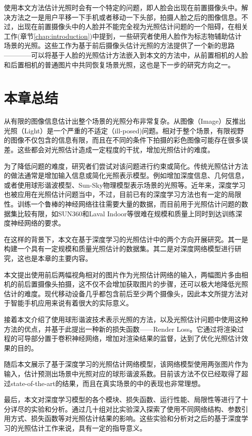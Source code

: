 使用本文方法估计光照时会有一个特定的问题，即人脸会出现在前置摄像头中。解决方法之一是用户平移一下手机或者移动一下头部，拍摄人脸之后的图像信息。不过，出现在前置摄像头中的人脸并不能完全视为光照估计问题的一个阻碍，在相关工作(章节\ref{chap:introduction})中提到，一些研究者使用人脸作为标志物辅助估计场景的光照。这些工作为基于前后摄像头估计光照的方法提供了一个新的思路————可以将基于人脸的光照估计方法嵌入到本文的方法中，从前置相机的人脸和后置相机的普通图片中共同恢复场景光照，这也是下一步的研究方向之一。
\section{本章总结}
从有限的图像信息估计出整个场景的光照分布非常复杂。从图像（Image）反推出光照（Light）是一个严重的不适定（ill-posed)问题。相对于整个场景，有限视野的图像不仅包含的信息有限，而且在不同的条件下拍摄的彩色图像可能存在很多误差。这些都会对光照估计造成一定程度的干扰，增加光照估计的难度。

为了降低问题的难度，研究者们尝试对该问题进行约束或简化。传统光照估计方法的做法通常是增加输入信息或简化光照表示模型。例如增加深度信息、几何信息，或者使用球形谐波模型、Sun-Sky物理模型表示场景的光照等。近年来，深度学习也被应用在光照估计问题当中，不过，目前已有的深度学习方法也有一定的局限性。训练一个鲁棒的神经网络往往需要大量的数据，而目前用于光照估计问题的数据集比较有限，如SUN360\cite{xiao2012recognizing}和Laval Indoor\cite{gardner2017learning}等很难在规模和质量上同时到达训练深度神经网络的要求。

在这样的背景下，本文在基于深度学习的光照估计中的两个方向开展研究。其一是构建一个具有一定规模和质量光照估计的数据集。其二是对深度网络模型进行研究，这也是本章的主要内容。

本文提出使用前后两幅视角相对的图片作为光照估计网络的输入，两幅图片多由相机的前后置摄像头拍摄，这不仅不会增加获取图片的步骤，还可以极大地降低光照估计的难度。现代移动设备几乎都包含前后至少两个摄像头，因此本文所提方法对于智能手机应用来说有着很大的实际意义。

接着本文介绍了使用球形谐波技术表示光照的方法，以及光照估计问题中使用这种方法的优点，并基于此提出一种新的损失函数——Render Loss。它通过将渲染过程的可导部分置于卷积神经网络，增加对渲染结果的监督，达到了优化光照估计效果的目的。

随后本文展示了基于深度学习的光照估计网络模型，该网络模型使用两张图片作为输入，估计预测出场景中光照对应的球形谐波系数。目前该方法不仅已经取得了超过state-of-the-art的结果，而且在真实场景的中的表现也非常理想。

最后，本文对深度学习模型的各个模块、损失函数、运行性能、局限性等进行了十分详尽的实验和分析。通过几十组对比实验深入探索了使用不同网络结构、参数引用方式、损失函数等对光照估计结果的影响。这些实验和分析对之后的基于深度学习的光照估计工作来说，具有一定的指导意义。
